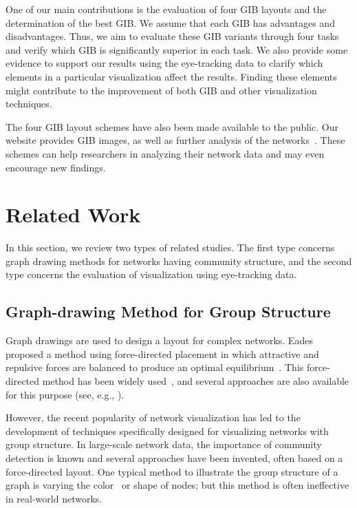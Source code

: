 \documentclass{vgtc}                          %
\begin{document}
One of our main contributions is the evaluation of four GIB layouts and the determination of the best GIB.
We assume that each GIB has advantages and disadvantages. Thus, we aim to evaluate these GIB variants through four tasks and verify which GIB is significantly superior in each task.
We also provide some evidence to support our results using the eye-tracking data to clarify which elements in a particular visualization affect the results.
Finding these elements might contribute to the improvement of both GIB and other visualization techniques.

The four GIB layout schemes have also been made available to the public. Our website provides GIB images, as well as further analysis of the networks~\cite{gibweb}.
These schemes can help researchers in analyzing their network data and may even encourage new findings.

%
\section{Related Work}
%
In this section, we review two types of related studies.
The first type concerns graph drawing methods for networks having community structure, and the second type concerns the evaluation of visualization using eye-tracking data.

\subsection{Graph-drawing Method for Group Structure}
Graph drawings are used to design a layout for complex networks.
Eades proposed a method using force-directed placement in which attractive and repulsive forces are balanced to produce an optimal equilibrium~\cite{eades84}.
This force-directed method has been widely used~\cite{Kobourov2013ForceDirectedDA}, and several approaches are also available for this purpose (see, e.g., \cite{harel2000fast,koren2003drawing,hachul2004drawing,article}).

However, the recent popularity of network visualization has led to the development of techniques specifically designed for visualizing networks with group structure.
In large-scale network data, the importance of community detection is known and several approaches have been invented, often based on a force-directed layout. One typical method to illustrate the group structure of a graph is varying the color~\cite{mcpherson2005discovering} or shape of nodes; but this method is often ineffective in real-world networks.
\end{document}
